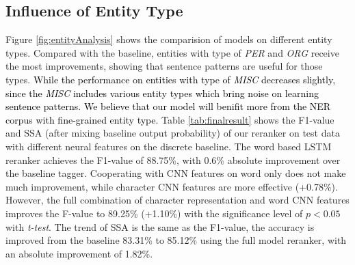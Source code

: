 \documentclass[11pt,a4paper]{article}
\begin{document}
\subsection{Influence of Entity Type}
Figure \ref{fig:entityAnalysis} shows the comparision of models on different entity types. Compared with the baseline, entities with type of \textit{PER} and \textit{ORG} receive the most improvements, showing that sentence patterns are useful for those types. \textcolor{black}{While the performance on entities with type of \textit{MISC} decreases slightly, since the \textit{MISC} includes various entity types which bring noise on learning sentence patterns. We believe that our model will benifit more from the NER corpus with fine-grained entity type.} Table \ref{tab:finalresult} shows the F1-value and SSA (after mixing baseline output probability) of our reranker on test data with different neural features on the discrete baseline. The word based LSTM reranker achieves the F1-value of 88.75\%, with 0.6\% absolute improvement over the baseline tagger. Cooperating with CNN features on word only does not make much improvement, while character CNN features are more effective (+0.78\%). However, the full combination of character representation and word CNN features improves the F-value to 89.25\% (+1.10\%) with the significance level of $p<0.05$ with \textit{t-test}. The trend of SSA is the same as the F1-value, the accuracy is improved from the baseline 83.31\% to 85.12\% using the full model reranker, with an absolute improvement of 1.82\%.

\begin{table}[t]
\begin{center}
\end{center}
\caption{F1-value and SSA on test set.}
\label{tab:finalresult}
\end{table}
\end{document}
